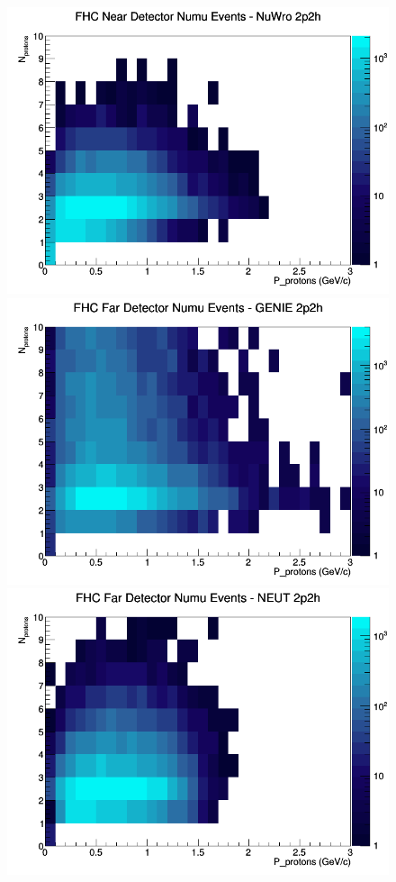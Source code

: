 \documentclass[12pt]{article}
\begin{document}
\begin{figure}[h]
\includegraphics[width=\linewidth]{N_P/nominal/protons/2p2h_FHC_ND_numu_N_P_NuWro.png}
\endminipage
\newline
{}
\includegraphics[width=\linewidth]{N_P/nominal/protons/2p2h_FHC_FD_numu_N_P_GENIE.png}
\endminipage
{}
\includegraphics[width=\linewidth]{N_P/nominal/protons/2p2h_FHC_FD_numu_N_P_NEUT.png}

\end{figure}
\end{document}

